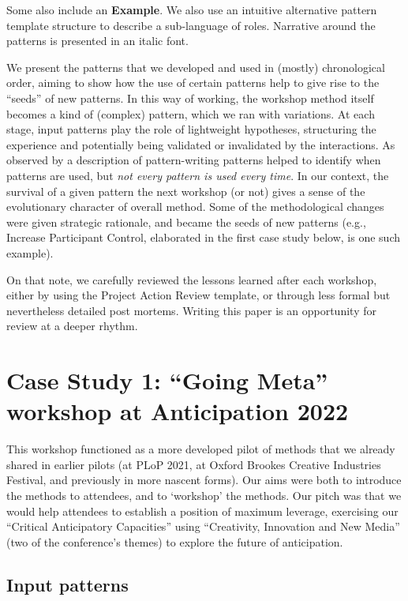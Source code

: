 \documentclass[acmlarge,timestamp]{acmart}
\begin{document}
Some also include an \textbf{Example}.  We also use an intuitive
alternative pattern template structure to describe a sub-language of
roles.  Narrative around the patterns is presented in an italic font.



We present the patterns that we developed and used in (mostly)
chronological order, aiming to show how the use of certain patterns
help to give rise to the ``seeds'' of new patterns.  In this way of
working, the workshop method itself becomes a kind of (complex)
pattern, which we ran with variations.  At each stage, input patterns
play the role of lightweight hypotheses, structuring the experience
and potentially being validated or invalidated by the interactions.
As observed by \citet{iba2016pattern} a description of pattern-writing
patterns helped to identify when patterns are used, but \emph{not
every pattern is used every time}.  In our context, the survival of a
given pattern the next workshop (or not) gives a sense of the
evolutionary character of overall method.  Some of the methodological
changes were given strategic rationale, and became the seeds of new
patterns (e.g., {\sc Increase Participant Control}, elaborated in the
first case study below, is one such example).

On that note, we carefully reviewed the lessons learned after each
workshop, either by using the Project Action Review template, or
through less formal but nevertheless detailed post mortems.  Writing
this paper is an opportunity for review at a deeper rhythm.

\clearpage

\section{Case Study 1: “Going Meta” workshop at Anticipation 2022}

This workshop functioned as a more developed pilot of methods that we
already shared in earlier pilots (at PLoP 2021, at Oxford Brookes
Creative Industries Festival, and previously in more nascent forms).
Our aims were both to introduce the methods to attendees, and to
‘workshop’ the methods.  Our pitch was that we would help attendees to
establish a position of maximum leverage, exercising our “Critical
Anticipatory Capacities” using “Creativity, Innovation and New Media”
(two of the conference’s themes) to explore the future of
anticipation.

\subsection{Input patterns} \label{case1-inputs}
\end{document}
